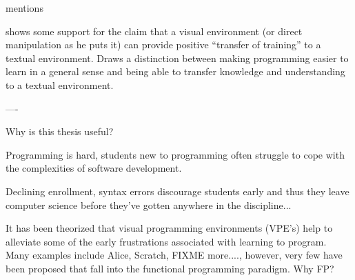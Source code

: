 \cite{Mahmoud04} mentions 

\cite{Hundhausen09} shows some support for the claim that a visual environment (or direct manipulation as he puts it) can provide positive ``transfer of training'' to a textual environment.  Draws a distinction between making programming easier to learn in a general sense and being able to transfer knowledge and understanding to a textual environment.



----

Why is this thesis useful?

Programming is hard, students new to programming often struggle to cope with the complexities of software development.

Declining enrollment, syntax errors discourage students early and thus they leave computer science before they've
gotten anywhere in the discipline...

It has been theorized that visual programming environments (VPE's) help to alleviate some of the early frustrations
associated with learning to program.  Many examples include Alice, Scratch, FIXME more...., however, very few have
been proposed that fall into the functional programming paradigm.  Why FP?
